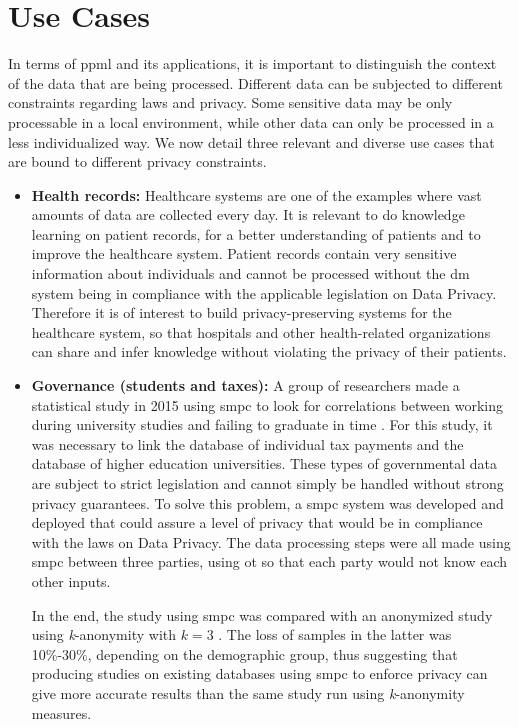 
\section{Use Cases}
\label{sec:UseCases}


In terms of \ac{ppml} and its applications, it is important to distinguish the context of the data that are being processed. Different data can be subjected to different constraints regarding laws and privacy. Some sensitive data may be only processable in a local environment, while other data can only be processed in a less individualized way.
We now detail three relevant and diverse use cases that are bound to different privacy constraints.

\begin{itemize}
	
	\item \textbf{Health records:} Healthcare systems are one of the examples where vast amounts of data are collected every day. It is relevant to do knowledge learning on patient records, for a better understanding of patients and to improve the healthcare system. Patient records contain very sensitive information about individuals and cannot be processed without the \ac{dm} system being in compliance with the applicable legislation on Data Privacy. Therefore it is of interest to build privacy-preserving systems for the healthcare system, so that hospitals and other health-related organizations can share and infer knowledge without violating the privacy of their patients.

	\item \textbf{Governance (students and taxes):} A group of researchers made a statistical study in 2015 using \ac{smpc} to look for correlations between working during university studies and failing to graduate in time \cite{Bogdanov2015}. For this study, it was necessary to link the database of individual tax payments and the database of higher education universities. These types of governmental data are subject to strict legislation and cannot simply be handled without strong privacy guarantees.
    To solve this problem, a \ac{smpc} system was developed and deployed that could assure a level of privacy that would be in compliance with the laws on Data Privacy. The data processing steps were all made using \ac{smpc} between three parties, using \ac{ot} so that each party would not know each other inputs.
    
    In the end, the study using \ac{smpc} was compared with an anonymized study using \textit{k}-anonymity with $\textit{k}=3$ . The loss of samples in the latter was 10\%-30\%, depending on the demographic group, thus suggesting that producing studies on existing databases using \ac{smpc} to enforce privacy can give more accurate results than the same study run using \textit{k}-anonymity measures.


\end{itemize}
